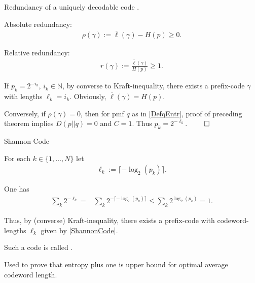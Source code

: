 \begin{frame}{Redundancy of a uniquely decodable code}
.
\bit
\item Absolute redundancy: 
\begin{align*}
\rho(\gamma):=\overline{\ell}(\gamma)-H(p)\geq 0.
\end{align*}
\item Relative redundancy:
\begin{align*}
r(\gamma):=\frac{\overline{\ell}(\gamma)}{H(p)}\geq 1.
\end{align*}
\eit
\smallskip
{}
\bit
\item If $p_k=2^{-i_k}$, $i_k\in\mathbb{N}$, by converse to Kraft-inequality, there exists a prefix-code $\gamma$ with lengths $\ell_k=i_k$. Obviously, 
$\overline{\ell}(\gamma)=H(p)$. 
\item Conversely, if $\rho(\gamma)=0$, then for pmf $q$ as in \eqref{DefqEntr}, proof of preceding theorem implies $D(p||q)=0$ and $C=1$. Thus 
$p_k=2^{-\ell_k}$. $\qed$
\eit
\end{frame}


\begin{frame}{Shannon Code}
\bit 
\item For each $k\in\{1,\dots,N\}$ let 
\begin{align}\label{ShannonCode}
\ell_k:=\lceil-\log_2({p_k})\rceil.
\end{align}
\item One has  
\begin{align*}
\sum_k2^{-\ell_k}=&\sum_k2^{-\lceil-\log_2({p_k})\rceil}
\leq\sum_k2^{\log_2(p_k)}=1.
\end{align*}
\item Thus, by (converse) Kraft-inequality, there exists a prefix-code with codeword-lengths $\ell_k$ given by \eqref{ShannonCode}.
\item Such a code is called .
\item Used to prove that entropy plus one is upper bound for optimal average codeword length. 
\eit
\end{frame}







